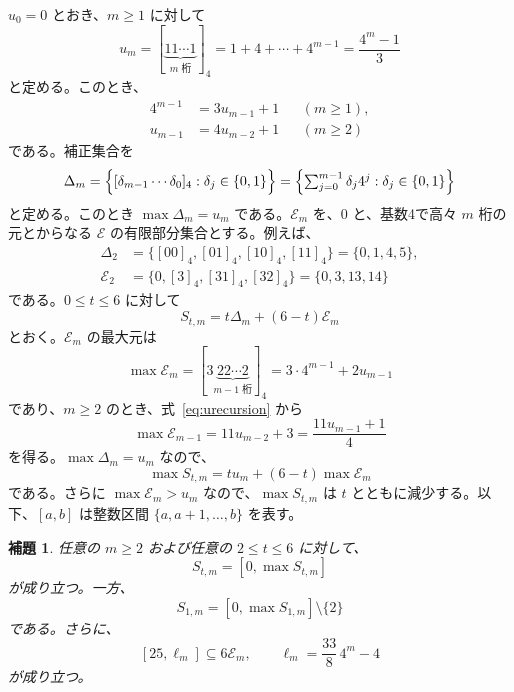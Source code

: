 \documentclass[12pt]{ltjsarticle}
\theoremstyle{plain}
\newtheorem{lemma}[theorem]{補題}
\theoremstyle{definition}
\theoremstyle{plain}
\begin{document}
$u_0=0$ とおき、$m\geq1$ に対して
\begin{equation}\label{eq:umdef}
 u_m=[\underbrace{11\cdots1}_{m\text{ 桁}}]_4
    =1+4+\cdots+4^{m-1}=\frac{4^m-1}{3}
\end{equation}
と定める。このとき、
\begin{equation}\label{eq:urecursion}
\begin{aligned}
 4^{m-1}&=3u_{m-1}+1 &&(m\geq1),\\
 u_{m-1}&=4u_{m-2}+1 &&(m\geq2)
\end{aligned}
\end{equation}
である。補正集合を
\[
 \Delta_m=\Bigl\{[\delta_{m-1}\cdots\delta_0]_4:\delta_j\in\{0,1\}\Bigr\}
    =\Bigl\{\textstyle\sum_{j=0}^{m-1}\delta_j4^j:\delta_j\in\{0,1\}\Bigr\}
\]
と定める。このとき $\max \Delta_m=u_m$ である。$\mathcal E_m$ を、$0$ と、基数4で高々 $m$ 桁の元とからなる $\mathcal E$ の有限部分集合とする。例えば、
\[
\begin{aligned}
 \Delta_2&=\{[00]_4,[01]_4,[10]_4,[11]_4\}=\{0,1,4,5\},\\
 \mathcal E_2&=\{0,[3]_4,[31]_4,[32]_4\}=\{0,3,13,14\}
\end{aligned}
\]
である。$0\leq t\leq6$ に対して
\begin{equation}\label{eq:S-t-m}
 S_{t,m}=t\Delta_m+(6-t)\mathcal E_m
\end{equation}
とおく。$\mathcal E_m$ の最大元は
\[
 \max\mathcal E_m=[3\underbrace{22\cdots2}_{m-1\text{ 桁}}]_4
                =3\cdot4^{m-1}+2u_{m-1}
\]
であり、$m\geq2$ のとき、式~\eqref{eq:urecursion} から
\begin{equation}\label{eq:maxErecursion}
 \max\mathcal E_{m-1}=11u_{m-2}+3=\frac{11u_{m-1}+1}{4}
\end{equation}
を得る。$\max \Delta_m=u_m$ なので、
\begin{equation}\label{eq:maxStm}
 \max S_{t,m}=tu_m+(6-t)\max\mathcal E_m
\end{equation}
である。さらに $\max\mathcal E_m>u_m$ なので、$\max S_{t,m}$ は $t$ とともに減少する。以下、$[a,b]$ は整数区間 $\{a,a+1,\ldots,b\}$ を表す。

\begin{lemma}\label{lem:mixed}
任意の $m\geq2$ および任意の $2\leq t\leq6$ に対して、
\begin{equation}\label{eq:mixedtge}
 S_{t,m}=[0,\max S_{t,m}]
\end{equation}
が成り立つ。一方、
\begin{equation}\label{eq:mixedtone}
 S_{1,m}=[0,\max S_{1,m}]\setminus\{2\}
\end{equation}
である。さらに、
\begin{equation}\label{eq:mixedEminterval}
 [25,\ell_m]\subseteq6\mathcal E_m,
 \qquad \ell_m=\frac{33}{8}\,4^m-4
\end{equation}
が成り立つ。
\end{lemma}
\end{document}
